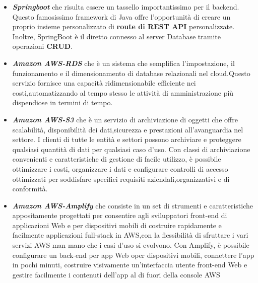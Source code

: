 \documentclass{article}
\begin{document}
		\begin{itemize}
			\item \textbf{\textit{\textcolor{dark_purple}{Springboot}}} che risulta essere un tassello importantissimo per il backend. Questo famosissimo framework di Java offre l'opportunità di creare un proprio insieme personalizzato di \textbf{route di REST API} personalizzate. Inoltre, SpringBoot è il diretto connesso al server Database tramite operazioni \textbf{CRUD}.
			\item \textbf{\textit{\textcolor{dark_purple}{Amazon AWS-RDS}}} che è un sistema che semplifica l’impostazione, il funzionamento e il dimensionamento di database relazionali nel cloud.Questo servizio fornisce una capacità ridimensionabile efficiente nei costi,automatizzando al tempo stesso le attività di amministrazione più dispendiose in termini di tempo.
			\item \textbf{\textit{\textcolor{dark_purple}{Amazon AWS-S3}}} che è un servizio di archiviazione di oggetti che offre scalabilità, disponibilità dei dati,sicurezza e prestazioni all’avanguardia nel settore. I clienti di tutte le entità e settori possono archiviare e proteggere qualsiasi quantità di dati per qualsiasi caso d’uso. Con classi di archiviazione convenienti e caratteristiche di gestione di facile utilizzo, è possibile ottimizzare i costi, organizzare i dati e configurare controlli di accesso ottimizzati per soddisfare specifici requisiti aziendali,organizzativi e di conformità.
			\item \textbf{\textit{\textcolor{dark_purple}{Amazon AWS-Amplify}}} che consiste in un set di strumenti e caratteristiche appositamente progettati per consentire agli sviluppatori front-end di applicazioni Web e per dispositivi mobili di costruire rapidamente e facilmente applicazioni full-stack in AWS,con la flessibilità di sfruttare i vari servizi AWS man mano che i casi d’uso si evolvono. Con Amplify, è possibile configurare un back-end per app Web oper dispositivi mobili, connettere l'app in pochi minuti, costruire visivamente un’interfaccia utente front-end Web e gestire facilmente i contenuti dell’app al di fuori della console AWS
		\end{itemize}
		
\end{document}
